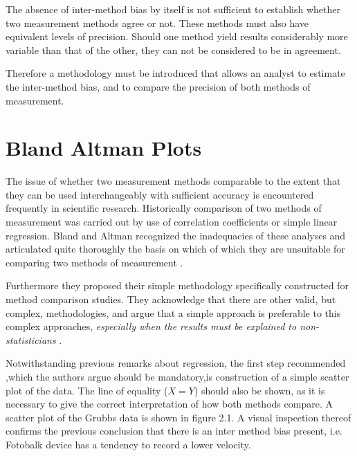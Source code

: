 \documentclass{report}
\begin{document}
\noindent The absence of inter-method bias by itself is not
sufficient to establish whether two measurement methods agree or
not. These methods must also have equivalent levels of precision.
Should one method yield results considerably more variable than
that of the other, they can not be considered to be in agreement.

Therefore a methodology must be introduced that allows an analyst
to estimate the inter-method bias, and to compare the precision of
both methods of measurement.
\newpage
\section{Bland Altman Plots}
The issue of whether two measurement methods comparable to the
extent that they can be used interchangeably with sufficient
accuracy is encountered frequently in scientific research.
Historically comparison of two methods of measurement was carried
out by use of correlation coefficients or simple linear
regression. Bland and Altman recognized the inadequacies of these
analyses and articulated quite thoroughly the basis on which of
which they are unsuitable for comparing two methods of measurement
\citep*{BA83}.


Furthermore they proposed their simple methodology specifically
constructed for method comparison studies. They acknowledge that
there are other valid, but complex, methodologies, and argue that
a simple approach is preferable to this complex approaches,
\emph{especially when the results must be explained to
	non-statisticians} \citep*{BA83}.

\smallskip

Notwithstanding previous remarks about regression, the first step
recommended ,which the authors argue should be mandatory,is
construction of a simple scatter plot of the data. The line of
equality ($X=Y$) should also be shown, as it is necessary to give
the correct interpretation of how both methods compare. A scatter
plot of the Grubbs data is shown in figure 2.1. A visual
inspection thereof confirms the previous conclusion that there is
an inter method bias present, i.e. Fotobalk device has a tendency
to record a lower velocity.
\end{document}
